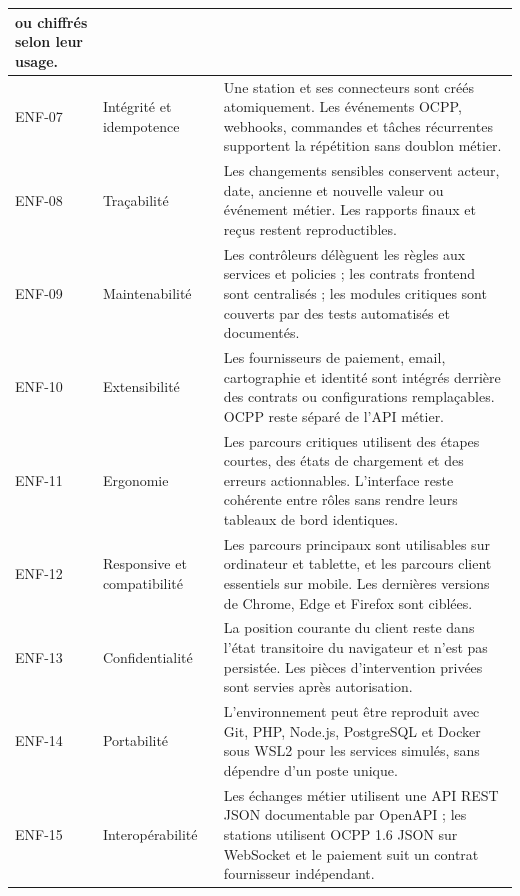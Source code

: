 \begin{longtable}{|C{1.45cm}|C{3.0cm}|p{9.2cm}|}
  ou chiffrés selon leur usage.\\\hline
  ENF-07 & Intégrité et idempotence &
  Une station et ses connecteurs sont créés atomiquement. Les événements OCPP,
  webhooks, commandes et tâches récurrentes supportent la répétition sans doublon
  métier.\\\hline
  ENF-08 & Traçabilité &
  Les changements sensibles conservent acteur, date, ancienne et nouvelle valeur ou
  événement métier. Les rapports finaux et reçus restent reproductibles.\\\hline
  ENF-09 & Maintenabilité &
  Les contrôleurs délèguent les règles aux services et policies ; les contrats
  frontend sont centralisés ; les modules critiques sont couverts par des tests
  automatisés et documentés.\\\hline
  ENF-10 & Extensibilité &
  Les fournisseurs de paiement, email, cartographie et identité sont intégrés derrière
  des contrats ou configurations remplaçables. OCPP reste séparé de l'API métier.\\\hline
  ENF-11 & Ergonomie &
  Les parcours critiques utilisent des étapes courtes, des états de chargement et des
  erreurs actionnables. L'interface reste cohérente entre rôles sans rendre leurs
  tableaux de bord identiques.\\\hline
  ENF-12 & Responsive et compatibilité &
  Les parcours principaux sont utilisables sur ordinateur et tablette, et les parcours
  client essentiels sur mobile. Les dernières versions de Chrome, Edge et Firefox
  sont ciblées.\\\hline
  ENF-13 & Confidentialité &
  La position courante du client reste dans l'état transitoire du navigateur et n'est
  pas persistée. Les pièces d'intervention privées sont servies après autorisation.\\\hline
  ENF-14 & Portabilité &
  L'environnement peut être reproduit avec Git, PHP, Node.js, PostgreSQL et Docker
  sous WSL2 pour les services simulés, sans dépendre d'un poste unique.\\\hline
  ENF-15 & Interopérabilité &
  Les échanges métier utilisent une API REST JSON documentable par OpenAPI ; les
  stations utilisent OCPP 1.6 JSON sur WebSocket et le paiement suit un contrat
  fournisseur indépendant.\\
  \hline
\end{longtable}
